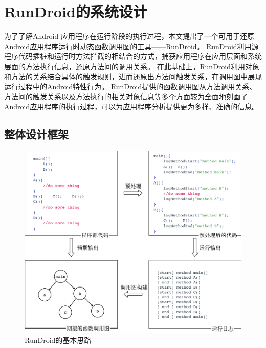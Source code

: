 \chapter{RunDroid的系统设计}
\label{chp:design}





为了了解Android 应用程序在运行阶段的执行过程，本文提出了一个可用于还原Android应用程序运行时动态函数调用图的工具——RunDroid。
RunDroid利用源程序代码插桩和运行时方法拦截的相结合的方式，捕获应用程序在应用层面和系统层面的方法执行信息，还原方法间的调用关系。
在此基础上，RunDroid利用对象和方法的关系结合具体的触发规则，进而还原出方法间触发关系，在调用图中展现运行过程中的Android特性行为。
RunDroid提供的函数调用图从方法调用关系、方法间的触发关系以及方法执行的相关对象信息等多个方面较为全面地刻画了Android应用程序的执行过程，可以为应用程序分析提供更为多样、准确的信息。


\section{整体设计框架}



\begin{figure}[!ht]
	\centering
	\includegraphics[width=\textwidth]{./Figures/code-sample.png}
	\caption{RunDroid的基本思路}
	\label{fig:code_sample}
\end{figure}



